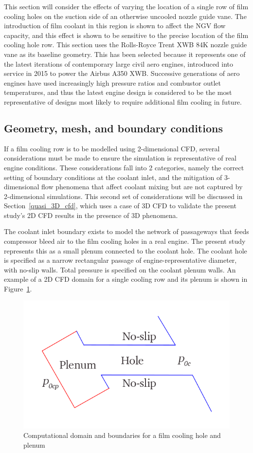 \documentclass[a4paper, 11pt, oneside]{report}
\begin{document}
This section will consider the effects of varying the location of a single row of film cooling holes on the suction side of an otherwise uncooled nozzle guide vane. The introduction of film coolant in this region is shown to affect the NGV flow capacity, and this effect is shown to be sensitive to the precise location of the film cooling hole row. This section uses the Rolls-Royce Trent XWB 84K nozzle guide vane as its baseline geometry. This has been selected because it represents one of the latest iterations of contemporary large civil aero engines, introduced into service in 2015 to power the Airbus A350 XWB. Successive generations of aero engines have used increasingly high pressure ratios and combustor outlet temperatures, and thus the latest engine design is considered to be the most representative of designs most likely to require additional film cooling in future.

\subsection{Geometry, mesh, and boundary conditions}

If a film cooling row is to be modelled using 2-dimensional CFD, several considerations must be made to ensure the simulation is representative of real engine conditions. These considerations fall into 2 categories, namely the correct setting of boundary conditions at the coolant inlet, and the mitigation of 3-dimensional flow phenomena that affect coolant mixing but are not captured by 2-dimensional simulations. This second set of considerations will be discussed in Section~\ref{quasi_3D_cfd}, which uses a case of 3D CFD to validate the present study's 2D CFD results in the presence of 3D phenomena.

The coolant inlet boundary exists to model the network of passageways that feeds compressor bleed air to the film cooling holes in a real engine. The present study represents this as a small plenum connected to the coolant hole. The coolant hole is specified as a narrow rectangular passage of engine-representative diameter, with no-slip walls. Total pressure is specified on the coolant plenum walls. An example of a 2D CFD domain for a single cooling row and its plenum is shown in Figure~\ref{fig:film_cooling_hole_boundary_conditions}.

\begin{figure}[H]
	\centering
	\includegraphics[width=.45\textwidth]{figs/film_cooling_hole_boundary_conditions.png}
	\caption{Computational domain and boundaries for a film cooling hole and plenum}
    \label{fig:film_cooling_hole_boundary_conditions}
\end{figure}
\end{document}
